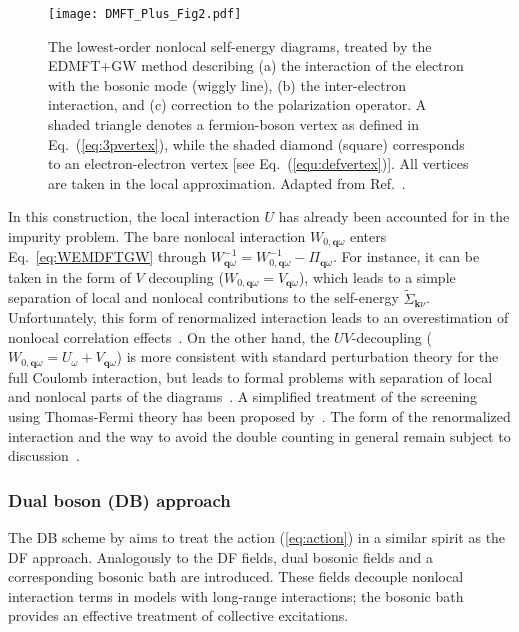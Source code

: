 \documentclass[rmp,aps,reprint,amsmath,amssymb,superscriptaddress,showpacs,nofootinbib]{revtex4-1}
\newcommand{\kv}{\ensuremath{\mathbf{k}}}
\newcommand{\qv}{\ensuremath{\mathbf{q}}}
\begin{document}
\begin{figure}
  \centering
  \texttt{[image: DMFT\_Plus\_Fig2.pdf]}
    \caption{The lowest-order nonlocal self-energy diagrams, treated by the EDMFT+GW method describing (a) the interaction of the electron with the bosonic mode (wiggly line), (b) the inter-electron interaction, and (c) correction to the polarization operator. A shaded triangle denotes a fermion-boson vertex as defined in Eq.~(\ref{eq:3pvertex}), while the shaded diamond (square) corresponds to an electron-electron vertex [see Eq.~(\ref{equ:defvertex})]. All vertices are taken in the local approximation. Adapted from Ref.~.}
  \label{fig:DMFT_Plus_Fig1}
\end{figure}

In this construction, the local interaction $U$ has already been accounted for in the impurity problem. The bare nonlocal interaction $W_{0,\qv\omega}$ enters Eq.~\eqref{eq:WEMDFTGW} through $W_{\qv\omega}^{-1}=W_{0,\qv\omega}^{-1}-\Pi_{\qv\omega}$. For instance, it can  be taken in the form of $V$ decoupling ($W_{0,\qv\omega} = V_{\qv\omega}$), which leads to a simple separation of local and nonlocal contributions to the self-energy $\widetilde{\Sigma}_{\kv\nu}$. Unfortunately, this form of renormalized interaction leads to an overestimation of nonlocal correlation effects~\cite{Ayral2012,Ayral2013}. On the other hand, the $UV$-decoupling ($W_{0,\qv\omega} = U_{\omega} + V_{\qv\omega}$) is more consistent with standard perturbation theory for the full Coulomb interaction, but leads to formal problems with separation of local and nonlocal parts of the diagrams~\cite{Stepanov2016a}. A simplified treatment of the screening using Thomas-Fermi theory has been proposed by~. The form of the renormalized interaction and the way to avoid the double counting in general remain  subject to discussion~\cite{Gukelberger2015}.

\subsubsection{Dual boson (DB) approach}
\label{sec:db}

The DB scheme by  aims to treat the action (\ref{eq:action}) in a similar  spirit as the DF approach. Analogously to the DF fields, dual bosonic fields and a corresponding bosonic bath are introduced. These fields decouple  nonlocal interaction terms in models with long-range interactions; the bosonic bath provides an effective treatment of collective excitations. 
\end{document}
